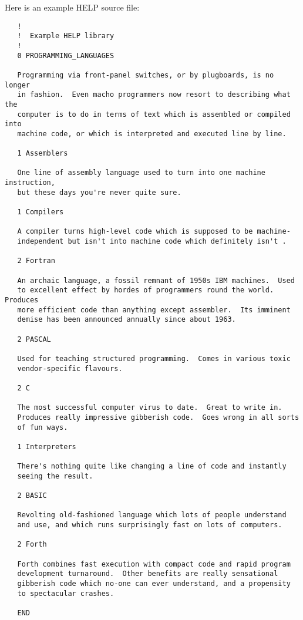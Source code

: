 Here is an example HELP source file:
\vspace{-1mm}
\begin{small}
\begin{verbatim}
   !
   !  Example HELP library
   !
   0 PROGRAMMING_LANGUAGES

   Programming via front-panel switches, or by plugboards, is no longer
   in fashion.  Even macho programmers now resort to describing what the
   computer is to do in terms of text which is assembled or compiled into
   machine code, or which is interpreted and executed line by line.

   1 Assemblers

   One line of assembly language used to turn into one machine instruction,
   but these days you're never quite sure.

   1 Compilers

   A compiler turns high-level code which is supposed to be machine-
   independent but isn't into machine code which definitely isn't .

   2 Fortran

   An archaic language, a fossil remnant of 1950s IBM machines.  Used
   to excellent effect by hordes of programmers round the world.  Produces
   more efficient code than anything except assembler.  Its imminent
   demise has been announced annually since about 1963.

   2 PASCAL

   Used for teaching structured programming.  Comes in various toxic
   vendor-specific flavours.

   2 C

   The most successful computer virus to date.  Great to write in.
   Produces really impressive gibberish code.  Goes wrong in all sorts
   of fun ways.

   1 Interpreters

   There's nothing quite like changing a line of code and instantly
   seeing the result.

   2 BASIC

   Revolting old-fashioned language which lots of people understand
   and use, and which runs surprisingly fast on lots of computers.

   2 Forth

   Forth combines fast execution with compact code and rapid program
   development turnaround.  Other benefits are really sensational
   gibberish code which no-one can ever understand, and a propensity
   to spectacular crashes.

   END
\end{verbatim}
\end{small}

